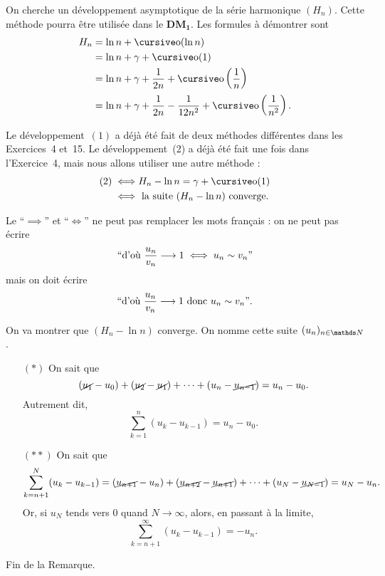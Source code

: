 \bigskip


On cherche un développement asymptotique de la série harmonique $(H_n)$. Cette méthode pourra être utilisée dans le {\bf DM$_{\mathbf{1}}$}. Les formules à démontrer sont
\begin{align}
	H_n &= \ln n + \po(\ln n) \\
	&= \ln n + \gamma + \po(1) \\
	&= \ln n + \gamma + \frac{1}{2n} + \po\left( \frac{1}{n} \right) \\
	&= \ln n + \gamma + \frac{1}{2n} - \frac{1}{12n^2} + \po\left( \frac{1}{n^2} \right).
\end{align}

Le développement~$(1)$\/ a déjà été fait de deux méthodes différentes dans les {\sc Exercices}\/~4 et~15. Le développement~(2) a déjà été fait une fois dans l'{\sc Exercice}\/~4, mais nous allons utiliser une autre méthode :
\begin{align*}
	(2) \iff& H_n - \ln n = \gamma + \po(1)\\
	\iff& \text{ la suite } (H_n - \ln n) \text{ converge}.
\end{align*}

\begin{rmkn}
	Le ``$\implies$\/'' et ``$\iff$\/'' ne peut pas remplacer les mots français : on ne peut pas écrire \[
		``\text{d'où } \frac{u_n}{v_n} \longrightarrow 1 \iff u_n \sim v_n"
	\] mais on doit écrire \[
		``\text{d'où } \frac{u_n}{v_n} \longrightarrow 1 \text{ donc } u_n \sim v_n"
	.\]
\end{rmkn}

On va montrer que $(H_n - \ln n)$\/ converge. On nomme cette suite $(u_n)_{n\in\N}$.

\begin{rmk}
	\begin{itemize}
		\item[$(*)$] On sait que \[
				(\cancel{u_1} - u_0) + (\cancel{u_2} - \cancel{u_1}) + \cdots + (u_n - \cancel{u_{n-1}}) = u_n - u_0
			.\] Autrement dit, \[
				\sum_{k=1}^n (u_k - u_{k-1}) = u_n - u_0
			.\]
		\item[$(**)$] On sait que \[
				\sum_{k=n+1}^N (u_k - u_{k-1}) = (\cancel{u_{n+1}} - u_n) + (\cancel{u_{n+2}} - \cancel{u_{n+1}}) + \cdots + (u_N - \cancel{u_{N-1}}) = u_N - u_n
			.\] Or, si $u_N$\/ tends vers $0$\/ quand $N\to \infty$, alors, en passant à la limite, \[
				\sum_{k=n+1}^\infty (u_k - u_{k-1}) = -u_n
			.\]
	\end{itemize}
\end{rmk}
Fin de la {\sc Remarque}.

